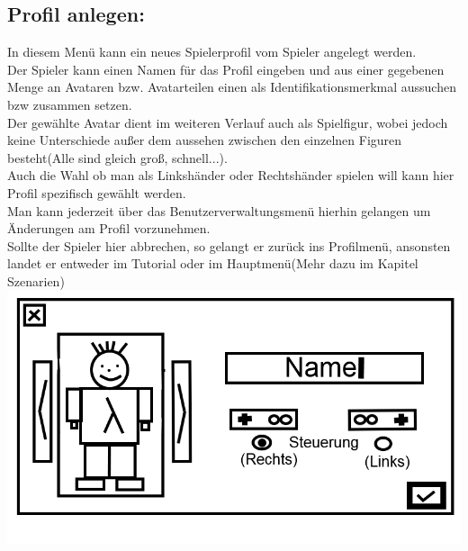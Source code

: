 \documentclass{scrartcl}
\begin{document}
\begin{enumerate}
	\begin{minipage}{1\textwidth}
		\item \subsection*{Profil anlegen:}
		In diesem Menü kann ein neues Spielerprofil vom Spieler angelegt werden.\\
		Der Spieler kann einen Namen für das Profil eingeben und aus einer gegebenen Menge an Avataren bzw. Avatarteilen einen als Identifikationsmerkmal aussuchen bzw zusammen setzen.\\
		Der gewählte Avatar dient im weiteren Verlauf auch als Spielfigur, wobei jedoch keine Unterschiede außer dem aussehen zwischen den einzelnen Figuren besteht(Alle sind gleich groß, schnell...).\\
		Auch die Wahl ob man als Linkshänder oder Rechtshänder spielen will kann hier Profil spezifisch gewählt werden.\\
		Man kann jederzeit über das Benutzerverwaltungsmenü hierhin gelangen um Änderungen am Profil vorzunehmen.\\
		Sollte der Spieler hier abbrechen, so gelangt er zurück ins Profilmenü, ansonsten landet er entweder im Tutorial oder im Hauptmenü(Mehr dazu im Kapitel Szenarien)\\
		\includegraphics[width=\textwidth]{assets/CreateProfile2}
	\end{minipage}
	

\end{enumerate}
\end{document}
